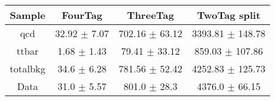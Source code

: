 \begin{footnotesize} 
\begin{tabular}{c|c|c|c} 
Sample & FourTag & ThreeTag & TwoTag split \\ 
\hline\hline 
qcd & 32.92 $\pm$ 7.07 & 702.16 $\pm$ 63.12 & 3393.81 $\pm$ 148.78\\ 
ttbar & 1.68 $\pm$ 1.43 & 79.41 $\pm$ 33.12 & 859.03 $\pm$ 107.86\\ 
totalbkg & 34.6 $\pm$ 6.28 & 781.56 $\pm$ 52.42 & 4252.83 $\pm$ 125.73\\ 
\hline 
Data & 31.0 $\pm$ 5.57 & 801.0 $\pm$ 28.3 & 4376.0 $\pm$ 66.15\\ 
\hline\hline 
\end{tabular} 
\end{footnotesize} 
\newline 
